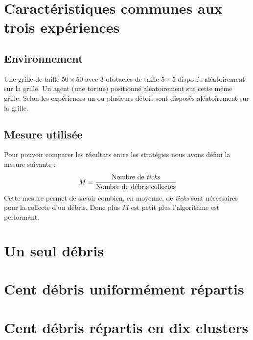 \section{Caractéristiques communes aux trois expériences}
\subsection{Environnement}
Une grille de taille $50 \times 50$ avec 3 obstacles de taille $5 \times 5$
disposés aléatoirement sur la grille. Un agent (une tortue) positionné aléatoirement
sur cette même grille. Selon les expériences un ou plusieurs débris sont disposés 
aléatoirement sur la grille.
\subsection{Mesure utilisée}
Pour pouvoir comparer les résultats entre les stratégies nous avons défini
la mesure suivante : $$M = \cfrac{\text{Nombre de \emph{ticks}}}{\text{Nombre de débris collectés}}$$
Cette mesure permet de savoir combien, en moyenne, de \emph{ticks} sont nécessaires
pour la collecte d'un débris. Donc plus $M$ est petit plus l'algorithme est performant.
\section{Un seul débris}



\section{Cent débris uniformément répartis}



\section{Cent débris répartis en dix clusters}

